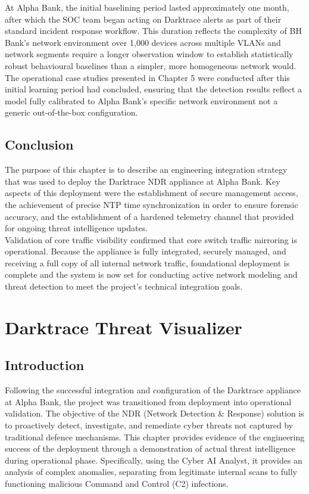 \documentclass[12pt,a4paper]{report}
\begin{document}
At Alpha Bank, the initial baselining period lasted approximately one month,
after which the SOC team began acting on Darktrace alerts as part of their
standard incident response workflow. This duration reflects the complexity of BH
Bank's network environment  over 1,000 devices across multiple VLANs and
network segments require a longer observation window to establish statistically
robust behavioural baselines than a simpler, more homogeneous network would.
The operational case studies presented in Chapter 5 were conducted after this
initial learning period had concluded, ensuring that the detection results reflect
a model fully calibrated to Alpha Bank's specific network environment  not a
generic out-of-the-box configuration.

\section{Conclusion}

The purpose of this chapter is to describe an engineering integration strategy that was used to deploy the Darktrace NDR appliance at Alpha Bank. Key aspects of this deployment were the establishment of secure management access, the achievement of precise NTP time synchronization in order to ensure forensic accuracy, and the establishment of a hardened telemetry channel that provided for ongoing threat intelligence updates.\\

Validation of core traffic visibility confirmed that core switch traffic mirroring is operational. Because the appliance is fully integrated, securely managed, and receiving a full copy of all internal network traffic, foundational deployment is complete and the system is now set for conducting active network modeling and threat detection to meet the project's technical integration goals.

\chapter{Darktrace Threat Visualizer}

\section{Introduction}
Following the successful integration and configuration of the Darktrace appliance at Alpha Bank, the project was transitioned from deployment into operational validation. The objective of the NDR (Network Detection \& Response) solution is to proactively detect, investigate, and remediate cyber threats not captured by traditional defence mechanisms. This chapter provides evidence of the engineering success of the deployment through a demonstration of actual threat intelligence during operational phase. Specifically, using the Cyber AI Analyst, it provides an analysis of complex anomalies, separating from legitimate internal scans to fully functioning malicious Command and Control (C2) infections.
\end{document}

